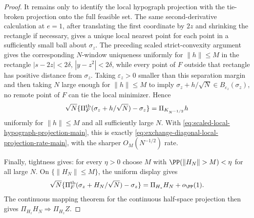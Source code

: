 \begin{proof}
It remains only to identify the local hypograph projection with the
tie-broken projection onto the full feasible set.  The same second-derivative
calculation at \(e=1\), after translating the first coordinate by \(2z\) and
shrinking the rectangle if necessary, gives a unique local nearest point for
each point in a sufficiently small ball about \(\sigma_z\).  The preceding
scaled strict-convexity argument gives the corresponding \(N\)-window
uniqueness uniformly for \(\|h\|\le M\) in the rectangle
\(|s-2z|<2\delta\), \(|y-z^2|<2\delta\), while every point of
\(F\) outside that rectangle has positive distance from \(\sigma_z\).  Taking
\(\varepsilon_z>0\) smaller than this separation margin and then taking
\(N\) large enough for \(\|h\|\le M\) to imply
\(\sigma_z+h/\sqrt N\in B_{\varepsilon_z}(\sigma_z)\), no remote point of
\(F\) can tie the local minimizer.  Hence
\[
\sqrt N\{\Pi_F^{\rm tb}(\sigma_z+h/\sqrt N)-\sigma_z\}
=\Pi_{K_{N^{-1/2}}}h
\]
uniformly for \(\|h\|\le M\) and all sufficiently large \(N\).  With
\eqref{eq:scaled-local-hypograph-projection-main}, this is exactly
\eqref{eq:exchange-diagonal-local-projection-rate-main}, with the sharper
\(O_M(N^{-1/2})\) rate.

Finally, tightness gives: for every \(\eta>0\) choose \(M\) with
\(\PP(\|H_N\|>M)<\eta\) for all large \(N\).  On \(\{\|H_N\|\le M\}\), the
uniform display gives
\[
\sqrt N\{\Pi_F^{\rm tb}(\sigma_z+H_N/\sqrt N)-\sigma_z\}
=\Pi_{H_z}H_N+o_{\PP}(1).
\]
The continuous mapping theorem for the continuous half-space projection then
gives \(\Pi_{H_z}H_N\Rightarrow\Pi_{H_z}Z\).
\end{proof}

